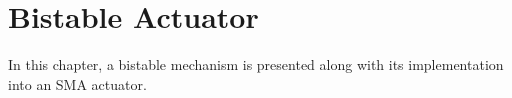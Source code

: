 \chapter{Bistable Actuator}
In this chapter, a bistable mechanism is presented along with its implementation into an SMA actuator.
